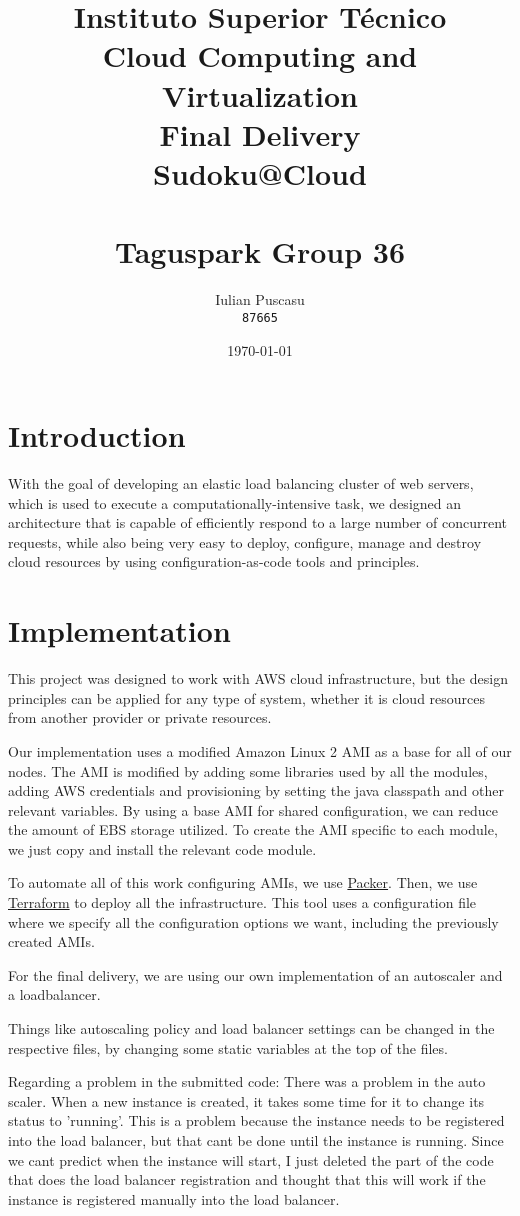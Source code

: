 \documentclass[10pt,twocolumn]{article}
\title{%
Instituto Superior Técnico\\
\huge Cloud Computing and Virtualization\\
\Large Final Delivery\\
\Huge Sudoku@Cloud\\
\ \\
\large Taguspark Group 36\\
}
\author{%
    Iulian Puscasu\\
    \texttt{87665}
}
\date{
    \today
}
\begin{document}
\maketitle

\section{Introduction}

With the goal of developing an elastic load balancing cluster of web servers, which is used to execute a computationally-intensive task,
we designed an architecture that is capable of efficiently respond to a large number of concurrent requests, while also being very easy to
deploy, configure, manage and destroy cloud resources by using configuration-as-code tools and principles.


\section{Implementation}

This project was designed to work with AWS cloud infrastructure, but the design principles can be applied for any type of system, whether it is
cloud resources from another provider or private resources.

Our implementation uses a modified Amazon Linux 2 AMI as a base for all of our nodes.
The AMI is modified by adding some libraries used by all the modules, adding AWS credentials and provisioning by setting the java classpath and
other relevant variables. By using a base AMI for shared configuration, we can reduce the amount of EBS storage utilized. To create the AMI
specific to each module, we just copy and install the relevant code module.

To automate all of this work configuring AMIs, we use \href{https://packer.io/}{Packer}.
Then, we use \href{https://www.terraform.io/}{Terraform} to deploy all the infrastructure. This tool uses a configuration file where we specify
all the configuration options we want, including the previously created AMIs.

For the final delivery, we are using our own implementation of an autoscaler and a loadbalancer.

Things like autoscaling policy and load balancer settings can be changed in the respective files, by changing some static variables at the top of the files.

Regarding a problem in the submitted code:
There was a problem in the auto scaler. When a new instance is created, it takes some time for it to change its status to 'running'.
This is a problem because the instance needs to be registered into the load balancer, but that cant be done until the instance is running.
Since we cant predict when the instance will start, I just deleted the part of the code that does the load balancer registration and
thought that this will work if the instance is registered manually into the load balancer.
\end{document}
